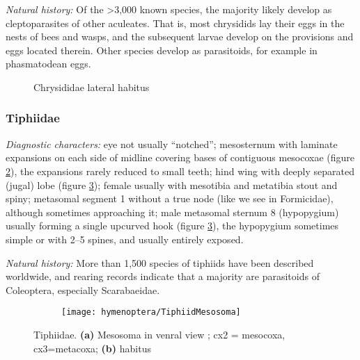 \noindent{}\textit{Natural history:} Of the \textgreater3,000 known species, the majority likely develop as cleptoparasites of other aculeates. That is, most chrysidids lay their eggs in the nests of bees and wasps, and the subsequent larvae develop on the provisions and eggs located therein. Other species develop as parasitoids, for example in phasmatodean eggs.

\begin{figure}[ht!]
  \centering
  \caption{Chrysididae lateral habitus \citep[][Fig. 42]{goulet1993hymenoptera}}
  \label{fig:chrysididae}
\end{figure}

\subsubsection{Tiphiidae}
\noindent{}\textit{Diagnostic characters:} eye not usually ``notched''; mesosternum with laminate expansions on each side of midline covering bases of contiguous mesocoxae (figure \ref{fig:tiphiid1}), the expansions rarely reduced to small teeth; hind wing with deeply separated (jugal) lobe (figure \ref{fig:tiphiid2}); female usually with mesotibia and metatibia stout and spiny; metasomal segment 1 without a true node (like we see in Formicidae), although sometimes approaching it; male metasomal sternum 8 (hypopygium) usually forming a single upcurved hook (figure \ref{fig:tiphiid2}), the hypopygium sometimes simple or with 2--5 spines, and usually entirely exposed.\vspace{3mm}

\noindent{}\textit{Natural history:} More than 1,500 species of tiphiids have been described worldwide, and rearing records indicate that a majority are parasitoids of Coleoptera, especially Scarabaeidae.

\begin{figure}[ht!]
    \centering
    \begin{subfigure}[ht!]{0.4\textwidth}
        \texttt{[image: hymenoptera/TiphiidMesosoma]}
        \caption{}
        \label{fig:tiphiid1}
    \end{subfigure}
    \qquad
    \begin{subfigure}[ht!]{0.45\textwidth}
        \caption{}
        \label{fig:tiphiid2}
    \end{subfigure}
    \caption{Tiphiidae. \textbf{(a)} Mesosoma in venral view \citep[][pg. 163]{goulet1993hymenoptera}; cx2 = mesocoxa, cx3=metacoxa; \textbf{(b)} habitus \citep[][Fig. 49]{goulet1993hymenoptera}}\label{fig:tiphiidae}
\end{figure}

